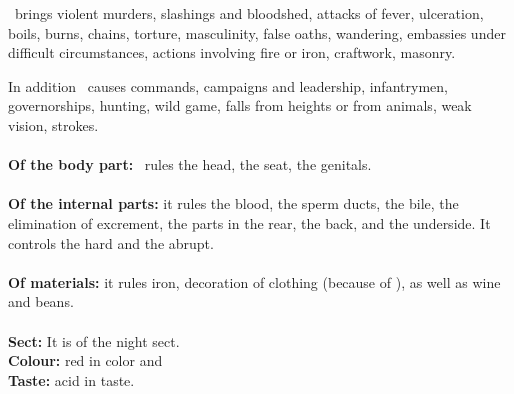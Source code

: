\Mars\, brings violent murders, slashings and bloodshed, attacks of fever, ulceration, boils, burns, chains, torture, masculinity, false oaths, wandering, embassies under difficult
circumstances, actions involving fire or iron, craftwork, masonry. 

In addition \Mars\, causes commands, campaigns and leadership, infantrymen, governorships, hunting, wild game, falls from heights or from animals, weak vision, strokes. \\
\\
\textbf{Of the body part:} \Mars\, rules the head, the seat, the genitals. \\
\\
\textbf{Of the internal parts:} it rules the blood, the sperm ducts, the bile, the elimination of excrement, the parts in the rear, the back, and the underside. It controls the hard and the abrupt. \\
\\
\textbf{Of materials:} it rules iron, decoration of clothing (because of \Aries), as well as wine and beans. \\
\\
\textbf{Sect:} It is of the night sect. \\
\textbf{Colour:} red in color and \\
\textbf{Taste:} acid in taste.

\secbr
